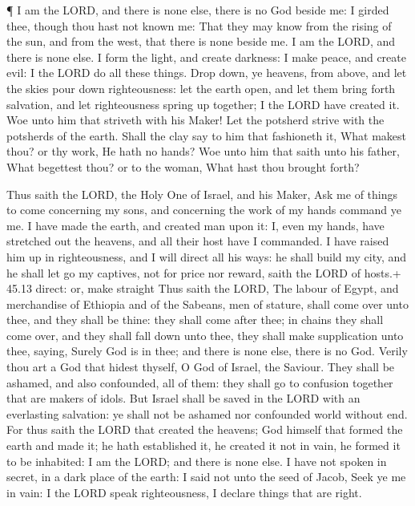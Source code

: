  ¶ I am the LORD, and there is none else, there is no God
beside me: I girded thee, though thou hast not known me: 
That they may know from the rising of the sun, and from the west, that
there is none beside me. I am the LORD, and there is none else.
 I form the light, and create darkness: I make peace, and
create evil: I the LORD do all these things.  Drop down, ye
heavens, from above, and let the skies pour down righteousness: let the
earth open, and let them bring forth salvation, and let righteousness
spring up together; I the LORD have created it.  Woe unto
him that striveth with his Maker! Let the potsherd strive with the
potsherds of the earth. Shall the clay say to him that fashioneth it,
What makest thou? or thy work, He hath no hands?  Woe unto
him that saith unto his father, What begettest thou? or to the woman,
What hast thou brought forth?

 Thus saith the LORD, the Holy One of Israel, and his
Maker, Ask me of things to come concerning my sons, and concerning the
work of my hands command ye me.  I have made the earth, and
created man upon it: I, even my hands, have stretched out the heavens,
and all their host have I commanded.  I have raised him up
in righteousness, and I will direct all his ways: he shall build my
city, and he shall let go my captives, not for price nor reward, saith
the LORD of hosts.+ 45.13 direct: or, make straight  Thus
saith the LORD, The labour of Egypt, and merchandise of Ethiopia and of
the Sabeans, men of stature, shall come over unto thee, and they shall
be thine: they shall come after thee; in chains they shall come over,
and they shall fall down unto thee, they shall make supplication unto
thee, saying, Surely God is in thee; and there is none else, there is no
God.  Verily thou art a God that hidest thyself, O God of
Israel, the Saviour.  They shall be ashamed, and also
confounded, all of them: they shall go to confusion together that are
makers of idols.  But Israel shall be saved in the LORD
with an everlasting salvation: ye shall not be ashamed nor confounded
world without end.  For thus saith the LORD that created
the heavens; God himself that formed the earth and made it; he hath
established it, he created it not in vain, he formed it to be inhabited:
I am the LORD; and there is none else.  I have not spoken
in secret, in a dark place of the earth: I said not unto the seed of
Jacob, Seek ye me in vain: I the LORD speak righteousness, I declare
things that are right.


